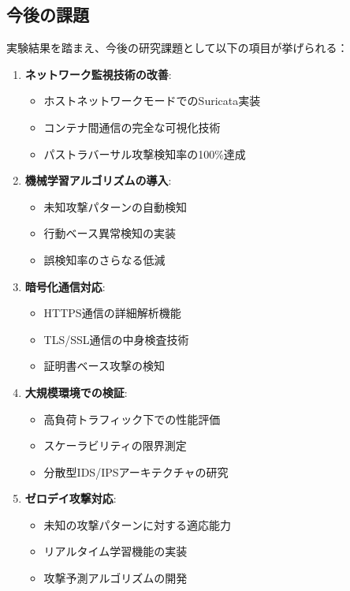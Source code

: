 \documentclass[12pt,a4paper]{article}
\begin{document}
\subsection{今後の課題}

実験結果を踏まえ、今後の研究課題として以下の項目が挙げられる：

\begin{enumerate}
    \item \textbf{ネットワーク監視技術の改善}: 
    \begin{itemize}
        \item ホストネットワークモードでのSuricata実装
        \item コンテナ間通信の完全な可視化技術
        \item パストラバーサル攻撃検知率の100\%達成
    \end{itemize}
    
    \item \textbf{機械学習アルゴリズムの導入}: 
    \begin{itemize}
        \item 未知攻撃パターンの自動検知
        \item 行動ベース異常検知の実装
        \item 誤検知率のさらなる低減
    \end{itemize}
    
    \item \textbf{暗号化通信対応}: 
    \begin{itemize}
        \item HTTPS通信の詳細解析機能
        \item TLS/SSL通信の中身検査技術
        \item 証明書ベース攻撃の検知
    \end{itemize}
    
    \item \textbf{大規模環境での検証}: 
    \begin{itemize}
        \item 高負荷トラフィック下での性能評価
        \item スケーラビリティの限界測定
        \item 分散型IDS/IPSアーキテクチャの研究
    \end{itemize}
    
    \item \textbf{ゼロデイ攻撃対応}: 
    \begin{itemize}
        \item 未知の攻撃パターンに対する適応能力
        \item リアルタイム学習機能の実装
        \item 攻撃予測アルゴリズムの開発
    \end{itemize}
\end{enumerate}
\end{document}
